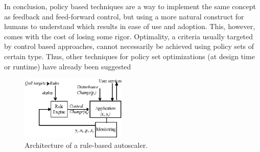 In conclusion, policy based techniques are a way to implement the same concept as feedback and feed-forward control, but using a more natural construct for humans to understand which results in ease of use and adoption. This, however, comes with the cost of losing some rigor. Optimality, a criteria usually targeted by control based approaches, cannot necessarily be achieved using policy sets of certain type. Thus, other techniques for policy set optimizations (at design time or runtime) have already been suggested \cite{simmons-strategy-2008,JRLoyolaEtAlCM2006,beigi-policy-transformation}
% 
% 
% 


\begin{figure}[tbh]
	\centering
	\includegraphics[width=0.45\textwidth]{image/feedback_rule_based.eps} 	
	\caption{Architecture of a rule-based autoscaler.}
	\label{fig:rule-based-resource-provisioner}
\end{figure}

